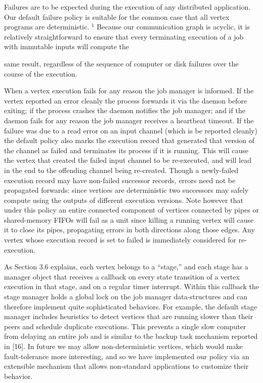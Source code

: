 \documentclass[
]{article}
\begin{document}
Failures are to be expected during the execution of any distributed
application. Our default failure policy is suitable for the common case
that all vertex programs are deterministic. \(^{1}\) Because our
communication graph is acyclic, it is relatively straightforward to
ensure that every terminating execution of a job with immutable inputs
will compute the

same result, regardless of the sequence of computer or disk failures
over the course of the execution.

When a vertex execution fails for any reason the job manager is
informed. If the vertex reported an error cleanly the process forwards
it via the daemon before exiting; if the process crashes the daemon
notifies the job manager; and if the daemon fails for any reason the job
manager receives a heartbeat timeout. If the failure was due to a read
error on an input channel (which is be reported cleanly) the default
policy also marks the execution record that generated that version of
the channel as failed and terminates its process if it is running. This
will cause the vertex that created the failed input channel to be
re-executed, and will lead in the end to the offending channel being
re-created. Though a newly-failed execution record may have non-failed
successor records, errors need not be propagated forwards: since
vertices are deterministic two successors may safely compute using the
outputs of different execution versions. Note however that under this
policy an entire connected component of vertices connected by pipes or
shared-memory FIFOs will fail as a unit since killing a running vertex
will cause it to close its pipes, propagating errors in both directions
along those edges. Any vertex whose execution record is set to failed is
immediately considered for re-execution.

As Section 3.6 explains, each vertex belongs to a ``stage,'' and each
stage has a manager object that receives a callback on every state
transition of a vertex execution in that stage, and on a regular timer
interrupt. Within this callback the stage manager holds a global lock on
the job manager data-structures and can therefore implement quite
sophisticated behaviors. For example, the default stage manager includes
heuristics to detect vertices that are running slower than their peers
and schedule duplicate executions. This prevents a single slow computer
from delaying an entire job and is similar to the backup task mechanism
reported in {[}16{]}. In future we may allow non-deterministic vertices,
which would make fault-tolerance more interesting, and so we have
implemented our policy via an extensible mechanism that allows
non-standard applications to customize their behavior.
\end{document}
